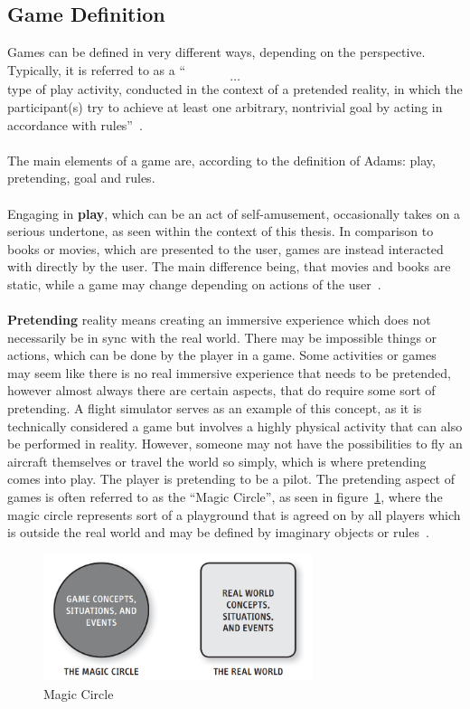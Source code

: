 \subsection{Game Definition}\label{subsec:game-definition}
Games can be defined in very different ways, depending on the perspective.
Typically, it is referred to as a ``\[\ldots\] type of play activity, conducted in the context of a pretended reality, in which the participant(s)
try to achieve at least one arbitrary, nontrivial goal by acting in accordance with rules''~\cite[p.~3]{10.5555/2544002}.
\\
\\
The main elements of a game are, according to the definition of Adams: play, pretending, goal and rules.
\\
\\
Engaging in \textbf{play}, which can be an act of self-amusement, occasionally takes on a serious undertone, as seen within the context of this thesis.
In comparison to books or movies, which are presented to the user, games are instead interacted with directly by the user.
The main difference being, that movies and books are static, while a game may change depending on actions of the user~\cite[p.~4-9]{10.5555/2544002}.
\\
\\
\textbf{Pretending} reality means creating an immersive experience which does not necessarily be in sync with the real world.
There may be impossible things or actions, which can be done by the player in a game.
Some activities or games may seem like there is no real immersive experience that needs to be pretended, however almost always there are certain
aspects, that do require some sort of pretending.
A flight simulator serves as an example of this concept, as it is technically considered a game but involves a highly physical activity that can also be performed in reality.
However, someone may not have the possibilities to fly an aircraft themselves or travel the world so simply, which is where pretending comes into play.
The player is pretending to be a pilot.
The pretending aspect of games is often referred to as the ``Magic Circle'', as seen in figure~\ref{fig:magic-circle}, where the magic circle represents sort of a
playground that is agreed on by all players which is outside the real world and may be defined by imaginary objects or rules~\cite[p.~4-9]{10.5555/2544002}.
\begin{figure}
    \centering
    \includegraphics[width=0.7\textwidth]{./Pictures/res/fundamentals/magic-circle}
    \caption{Magic Circle~\cite[p.~5]{10.5555/2544002}}
    \label{fig:magic-circle}
\end{figure}
